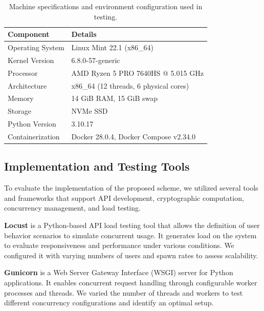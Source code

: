 \documentclass[cic,tc,english]{iiufrgs}
\numberwithin{algorithm}{chapter}
\begin{document}
            \begin{table}[h]
                \centering
                \begin{tabular}{|l|l|}
                \hline
                \textbf{Component} & \textbf{Details} \\ \hline
                Operating System & Linux Mint 22.1 (x86\_64) \\ \hline
                Kernel Version & 6.8.0-57-generic \\ \hline
                Processor & AMD Ryzen 5 PRO 7640HS @ 5.015 GHz \\ \hline
                Architecture & x86\_64 (12 threads, 6 physical cores) \\ \hline
                Memory & 14 GiB RAM, 15 GiB swap \\ \hline
                Storage & NVMe SSD \\ \hline
                Python Version & 3.10.17 \\ \hline
                Containerization & Docker 28.0.4, Docker Compose v2.34.0 \\ \hline
                \end{tabular}
                \caption{Machine specifications and environment configuration used in testing.}
                \label{tab:machine_specs}
            \end{table}

        \subsection{Implementation and Testing Tools}
        \label{subsec:tools}

            To evaluate the implementation of the proposed scheme, we utilized several tools and frameworks that support API development, cryptographic computation, concurrency management, and load testing.

            \textbf{Locust} is a Python-based API load testing tool that allows the definition of user behavior scenarios to simulate concurrent usage. It generates load on the system to evaluate responsiveness and performance under various conditions. We configured it with varying numbers of users and spawn rates to assess scalability.

            \textbf{Gunicorn} is a Web Server Gateway Interface (WSGI) server for Python applications. It enables concurrent request handling through configurable worker processes and threads. We varied the number of threads and workers to test different concurrency configurations and identify an optimal setup.
\end{document}
